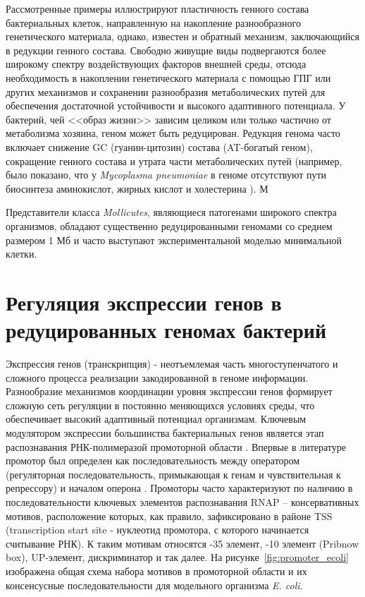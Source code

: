 \documentclass[14pt]{extreport}
\begin{document}
Рассмотренные примеры иллюстрируют пластичность генного состава бактериальных клеток, направленную на накопление разнообразного генетического материала, однако, известен и обратный механизм, заключающийся в редукции генного состава. Свободно живущие виды подвергаются более широкому спектру воздействующих факторов внешней среды, отсюда необходимость в накоплении генетического материала с помощью ГПГ или других механизмов и сохранении разнообразия метаболических путей для обеспечения достаточной устойчивости и высокого адаптивного потенциала. У бактерий, чей <<образ жизни>> зависим целиком или только частично от метаболизма хозяина, геном может быть редуцирован. Редукция генома часто включает снижение GC (гуанин-цитозин) состава (AT-богатый геном), сокращение генного состава и утрата части метаболических путей (например, было показано, что у \textit{Mycoplasma pneumoniae} в геноме отсутствуют пути биосинтеза аминокислот, жирных кислот и холестерина \cite{himmelreich1996complete}). М

Представители класса \textit{Mollicutes}, являющиеся патогенами широкого спектра организмов, обладают существенно редуцированными геномами со среднем размером 1 Мб и часто выступают экспериментальной моделью минимальной клетки.

\section{Регуляция экспрессии генов в редуцированных геномах бактерий}

Экспрессия генов (транскрипция) - неотъемлемая часть многоступенчатого и сложного процесса реализации закодированной в геноме информации. Разнообразие механизмов координации уровня экспрессии генов формирует сложную сеть регуляции в постоянно меняющихся условиях среды, что обеспечивает высокий адаптивный потенциал организмам. Ключевым модулятором экспрессии большинства бактериальных генов является этап распознавания РНК-полимеразой промоторной области \cite{browning2004regulation}. Впервые в литературе промотор был определен как последовательность между оператором (регуляторная последовательность, примыкающая к генам и чувствительная к репрессору) и началом оперона \cite{jacob1964promoteur}. Промоторы часто характеризуют по наличию в последовательности ключевых элементов распознавания RNAP -- консервативных мотивов, расположение которых, как правило, зафиксировано в районе TSS (transcription start site - нуклеотид промотора, с которого
начинается считывание РНК). К таким мотивам относятся -35 элемент, -10 элемент (Pribnow box), UP-элемент, дискриминатор и так далее. На рисунке~\ref{fig:promoter_ecoli} изображена общая схема набора мотивов в промоторной области и их консенсусные последовательности для модельного организма \textit{E. coli}.
\end{document}

